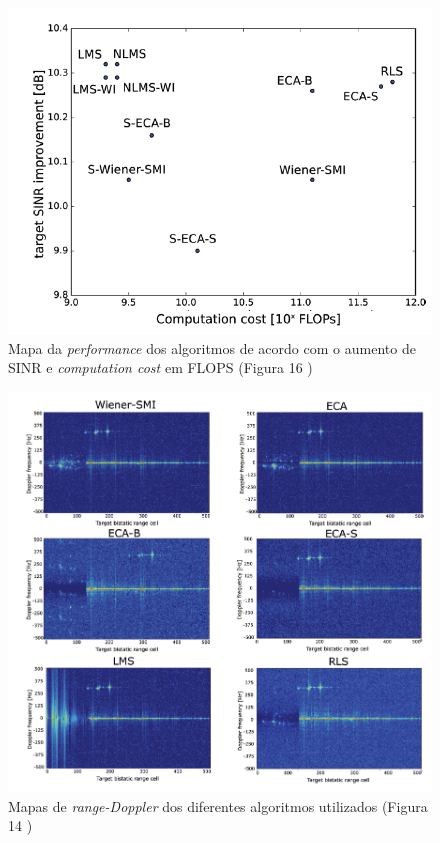 \begin{figure}[h]
\centering
\includegraphics[scale=0.5]{chapters/ch4/assets/comp_cost}
\caption[Mapa da performance dos algoritmos]{Mapa da \textit{performance} dos algoritmos de acordo com o aumento de \gls{SINR} e \textit{computation cost} em \gls{FLOPS} (Figura 16 \cite{Peto2018})}
\label{fig:comp_cost}
\end{figure}

\begin{figure}[h]
\centering
\includegraphics[scale=0.5]{chapters/ch4/assets/doppler_cancelationtec}
\caption[Mapas de range-Doppler dos diferentes algoritmos utilizados]{Mapas de \textit{range-Doppler} dos diferentes algoritmos utilizados (Figura 14 \cite{Peto2018})}
\label{fig:doppler_cancelationtec}
\end{figure}


